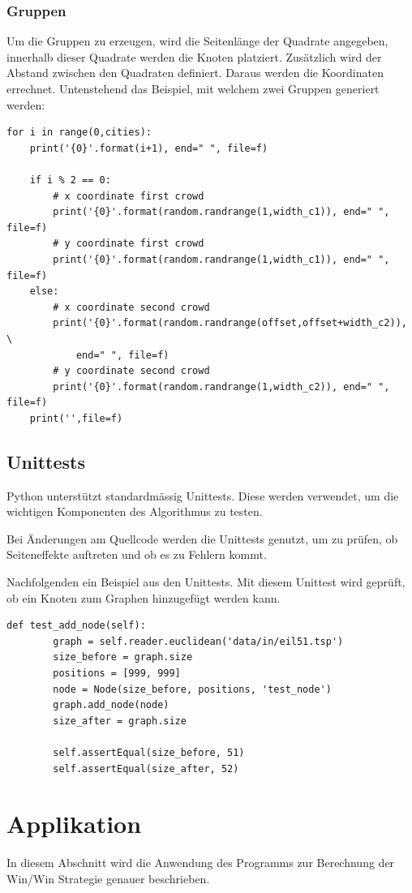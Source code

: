 \documentclass[11pt,a4paper]{article}
\begin{document}
\subsubsection{Gruppen}
Um die Gruppen zu erzeugen, wird die Seitenlänge der Quadrate angegeben, innerhalb dieser Quadrate werden die Knoten platziert. Zusätzlich wird der Abstand zwischen den Quadraten definiert. Daraus werden die Koordinaten errechnet. Untenstehend das Beispiel, mit welchem zwei Gruppen generiert werden:

\begin{verbatim}
for i in range(0,cities):
    print('{0}'.format(i+1), end=" ", file=f)

    if i % 2 == 0:
        # x coordinate first crowd
        print('{0}'.format(random.randrange(1,width_c1)), end=" ", file=f)
        # y coordinate first crowd
        print('{0}'.format(random.randrange(1,width_c1)), end=" ", file=f)
    else:
        # x coordinate second crowd
        print('{0}'.format(random.randrange(offset,offset+width_c2)), \
            end=" ", file=f)
        # y coordinate second crowd
        print('{0}'.format(random.randrange(1,width_c2)), end=" ", file=f)
    print('',file=f)
\end{verbatim}

\subsection{Unittests}
Python unterstützt standardmässig Unittests. Diese werden verwendet, um die wichtigen Komponenten des Algorithmus zu testen.

Bei Änderungen am Quellcode werden die Unittests genutzt, um zu prüfen, ob Seiteneffekte auftreten und ob es zu Fehlern kommt.

Nachfolgenden ein Beispiel aus den Unittests. Mit diesem Unittest wird geprüft, ob ein Knoten zum Graphen hinzugefügt werden kann.

\begin{verbatim}
def test_add_node(self):
        graph = self.reader.euclidean('data/in/eil51.tsp')
        size_before = graph.size
        positions = [999, 999]
        node = Node(size_before, positions, 'test_node')
        graph.add_node(node)
        size_after = graph.size
    
        self.assertEqual(size_before, 51) 
        self.assertEqual(size_after, 52)
\end{verbatim}
\newpage

\section{Applikation}
In diesem Abschnitt wird die Anwendung des Programms zur Berechnung der Win/Win Strategie genauer beschrieben.
\end{document}
